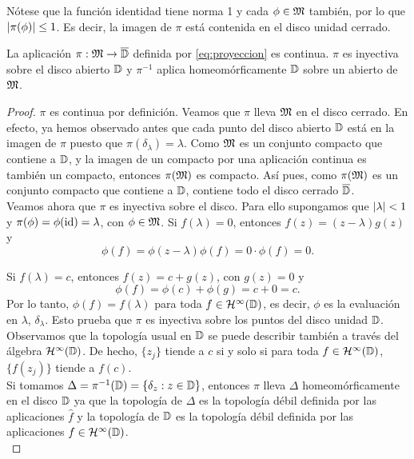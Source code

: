 Nótese que la función identidad tiene norma 1 y cada $\phi \in \mathfrak{M}$ también, por lo que $\left\lvert\pi(\phi)\right\rvert \leq 1$. Es decir, la imagen de $\pi$ está contenida en el disco unidad cerrado. \\

\begin{theorem}
    La aplicación $\pi: \mathfrak{M} \to \overline{\mathbb{D}}$ definida por \eqref{eq:proyeccion} es continua. $\pi$ es inyectiva sobre el disco abierto $\mathbb{D}$ y $\pi^{-1}$ aplica homeomórficamente $\mathbb{D}$ sobre un abierto de $\mathfrak{M}$.
\end{theorem}

\begin{proof}
$\pi$ es continua por definición. Veamos que $\pi$ lleva $\mathfrak{M}$ en el disco cerrado. En efecto, ya hemos observado antes que cada punto del disco abierto $\mathbb{D}$ está en la imagen de $\pi$ puesto que $\pi (\delta_\lambda) = \lambda$. Como $\mathfrak{M}$ es un conjunto compacto que contiene a $\mathbb{D}$, y la imagen de un compacto por una aplicación continua es también un compacto, entonces $\pi(\mathfrak{M})$ es compacto. Así pues, como $\pi(\mathfrak{M})$ es un conjunto compacto que contiene a $\mathbb{D}$, contiene todo el disco cerrado $\overline{\mathbb{D}}$. \\

Veamos ahora que $\pi$ es inyectiva sobre el disco. Para ello supongamos que $\left\lvert\lambda\right\rvert < 1$ y $\pi (\phi) = \phi (\operatorname{id}) = \lambda$, con $\phi \in \mathfrak{M}$. Si $f(\lambda) = 0$, entonces $f(z) = (z - \lambda) g(z)$ y
\begin{equation*}
    \phi(f) = \phi(z - \lambda) \phi(f) = 0 \cdot \phi(f) = 0.
\end{equation*}

Si $f(\lambda) = c$, entonces $f(z) = c + g(z)$, con $g(z) = 0$ y
\begin{equation*}
    \phi(f) = \phi(c) + \phi(g) = c + 0 = c.
\end{equation*}
Por lo tanto, $\phi(f) = f(\lambda)$ para toda $f \in \mathcal{H}^{\infty}(\mathbb{D})$, es decir, $\phi$ es la evaluación en $\lambda$, $\delta_\lambda$. Esto prueba que $\pi$ es inyectiva sobre los puntos del disco unidad $\mathbb{D}$. \\

Observamos que la topología usual en $\mathbb{D}$ se puede describir también a través del álgebra $\mathcal{H}^{\infty}(\mathbb{D})$. De hecho, $\{z_j\}$ tiende a $c$ si y solo si para toda $f \in \mathcal{H}^{\infty}(\mathbb{D})$, $\{f(z_j)\}$ tiende a $f(c)$. \\

Si tomamos $\Delta = \pi^{-1} (\mathbb{D}) = \{\delta_z : z \in \mathbb{D}\}$, entonces $\pi$ lleva $\Delta$ homeomórficamente en el disco $\mathbb{D}$ ya que la topología de $\Delta$ es la topología débil definida por las aplicaciones $\widehat f$ y la topología de $\mathbb{D}$ es la topología débil definida por las aplicaciones $f \in \mathcal{H}^{\infty}(\mathbb{D})$. \\
\end{proof}

